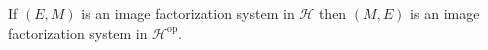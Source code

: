 If $(E, M)$ is an image factorization system in $\mathcal{H}$ then $(M, E)$ is an image factorization system in $\mathcal{H}^{\mathrm{op}}$.
